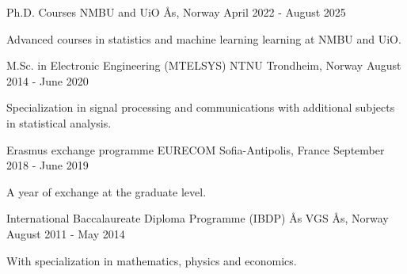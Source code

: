 \begin{cventries}
    \cventryYJS
        {Ph.D. Courses}
        {NMBU and UiO}
        {Ås, Norway}
        {April 2022 - August 2025}
        {
        \begin{cvitems}
        \item {Advanced courses in statistics and machine learning learning at NMBU and UiO.}
        \end{cvitems}
        }
    \cventryYJS
        {M.Sc. in Electronic Engineering (MTELSYS)}
        {NTNU}
        {Trondheim, Norway}
        {August 2014 - June 2020}
        {
        \begin{cvitems}
            \item {Specialization in signal processing and communications with additional subjects in statistical analysis.}
        \end{cvitems}
        }
    \cventryYJS
        {Erasmus exchange programme}
        {EURECOM}
        {Sofia-Antipolis, France}
        {September 2018 - June 2019}
        {
        \begin{cvitems}
        \item {A year of exchange at the graduate level.}
        \end{cvitems}
        }
    \cventryYJS
        {International Baccalaureate Diploma Programme (IBDP)}
        {Ås VGS}
        {Ås, Norway}
        {August 2011 - May 2014}
        {
        \begin{cvitems}
        \item {With specialization in mathematics, physics and economics.}
        \end{cvitems}
        }
\end{cventries}